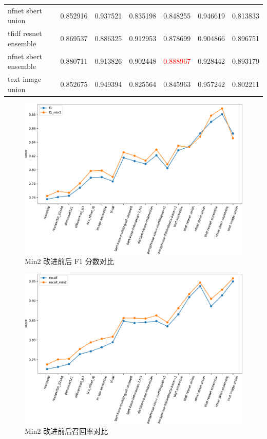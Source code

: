 \documentclass[12pt]{article}
\begin{document}
\begin{table}[htbp]
\begin{tabular}{lllllll}
    nfnet sbert union                & 0.852916 & 0.937521 & 0.835198  & 0.848255 & 0.946619     & 0.813833        \\
    tfidf resnet ensemble            & 0.869537 & 0.886325 & 0.912953  & 0.878699 & 0.904866     & 0.896751        \\
    nfnet sbert ensemble             & 0.880711 & 0.913826 & 0.902448  & \textcolor{red}{0.888967} & 0.928442     & 0.893179        \\
    text image union                 & 0.852675 & 0.949394 & 0.825564  & 0.845963 & 0.957242     & 0.802211       \\
    \bottomrule
  \end{tabular}
\end{table}

\begin{figure}[htbp]
  \centering
  \includegraphics[width=12cm]{min2_results_f1_df.pdf}
  \caption{Min2 改进前后 F1 分数对比}
  \label{fig:min2_results_f1}
\end{figure}

\begin{figure}[htbp]
  \centering
  \includegraphics[width=14cm]{min2_results_recall_df.pdf}
  \caption{Min2 改进前后召回率对比}
  \label{fig:min2_results_recall}
\end{figure}
\end{document}
